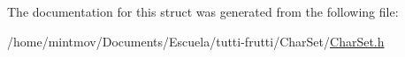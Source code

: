 The documentation for this struct was generated from the following file\-:\begin{DoxyCompactItemize}
\item 
/home/mintmov/\-Documents/\-Escuela/tutti-\/frutti/\-Char\-Set/\hyperlink{CharSet_8h}{Char\-Set.\-h}\end{DoxyCompactItemize}
